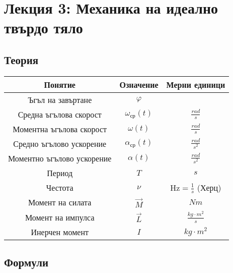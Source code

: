 \documentclass[fleqn, 12pt]{article}
\theoremstyle{definition}
\begin{document}
\newpage
\section{Лекция 3: Механика на идеално твърдо тяло}

\subsection{Теория}

\begin{center}
\begin{tabular}{ |c|c|c|}
\hline
\textbf{Понятие} &\textbf{Означение} & \textbf{Мерни единици}\\
\hline
Ъгъл на завъртане & $\varphi $ & \\
\hline
Средна ъгълова скорост & $\omega_{\text{ср}} (t)$ & $\frac{rad}{s}$\\
\hline
Моментна ъгълова скорост & $\omega (t)$ & $\frac{rad}{s}$\\
\hline
Средно ъгълово ускорение & $\alpha_{\text{ср}} (t)$ & $\frac{rad}{s^2}$\\
\hline
Моментно ъгълово ускорение & $\alpha (t)$ & $\frac{rad}{s^2}$\\
\hline
Период & $T$ & $s$ \\
\hline 
Честота & $\nu$ & $\text{Hz} = \frac{1}{s}$ (Херц)\\
\hline 
Момент на силата & $ \vec{M} $ & $Nm$\\
\hline 
Момент на импулса & $ \vec{L} $ & $\frac{kg \cdot m^2}{s}$\\
\hline
Инерчен момент & $I$ & $kg \cdot m^2$\\
\hline
\end{tabular}
\end{center}
\newpage
\subsection{Формули}
\end{document}
